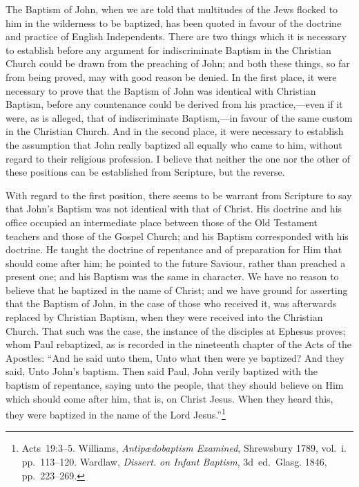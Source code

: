 \documentclass[
]{book}
\begin{document}
The Baptism of John, when we are told that multitudes of the Jews flocked to him in the wilderness to be baptized, has been quoted in favour of the doctrine and practice of English Independents. There are two things which it is necessary to establish before any argument for indiscriminate Baptism in the Christian Church could be drawn from the preaching of John; and both these things, so far from being proved, may with good reason be denied. In the first place, it were necessary to prove that the Baptism of John was identical with Christian Baptism, before any countenance could be derived from his practice,---even if it were, as is alleged, that of indiscriminate Baptism,---in favour of the same custom in the Christian Church. And in the second place, it were necessary to establish the assumption that John really baptized all equally who came to him, without regard to their religious profession. I believe that neither the one nor the other of these positions can be established from Scripture, but the reverse.

With regard to the first position, there seems to be warrant from Scripture to say that John's Baptism was not identical with that of Christ. His doctrine and his office occupied an intermediate place between those of the Old Testament teachers and those of the Gospel Church; and his Baptism corresponded with his doctrine. He taught the doctrine of repentance and of preparation for Him that should come after him; he pointed to the future Saviour, rather than preached a present one; and his Baptism was the same in character. We have no reason to believe that he baptized in the name of Christ; and we have ground for asserting that the Baptism of John, in the case of those who received it, was afterwards replaced by Christian Baptism, when they were received into the Christian Church. That such was the case, the instance of the disciples at Ephesus proves; whom Paul rebaptized, as is recorded in the nineteenth chapter of the Acts of the Apostles: ``And he said unto them, Unto what then were ye baptized? And they said, Unto John's baptism. Then said Paul, John verily baptized with the baptism of repentance, saying unto the people, that they should believe on Him which should come after him, that is, on Christ Jesus. When they heard this, they were baptized in the name of the Lord Jesus.''\footnote{Acts~19:3--5. Williams, \emph{Antipædobaptism Examined}, Shrewsbury 1789, vol.~i. pp.~113--120. Wardlaw, \emph{Dissert. on Infant Baptism}, 3d~ed.~Glasg. 1846, pp.~223--269.}
\end{document}
